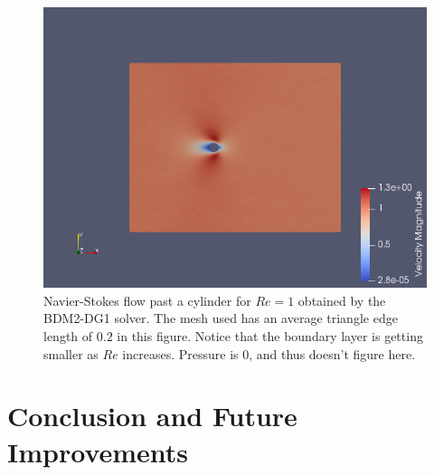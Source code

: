 \documentclass[11pt,twoside,a4paper]{article}
\begin{document}
\begin{figure}
  \includegraphics[width=\linewidth]{nscR1.png}
  \caption{Navier-Stokes flow past a cylinder for $Re = 1$ obtained by the BDM2-DG1 solver. The mesh used has an average triangle edge length of $0.2$ in this figure. Notice that the boundary layer is getting smaller as $Re$ increases. Pressure is $0$, and thus doesn't figure here.}
\end{figure}



\section{Conclusion and Future Improvements}
\end{document}
